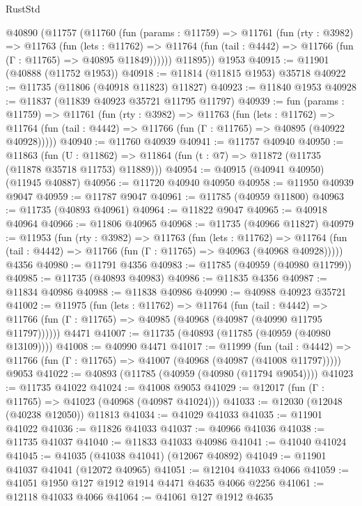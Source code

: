 \begin{lexlean}{RustStd}
\begin{coremodule}
    @40890
      (@11757
        (@11760
          (fun (params : @11759) =>
          @11761
            (fun (rty : @3982) =>
            @11763
              (fun (lets : @11762) =>
              @11764 (fun (tail : @4442) => @11766 (fun (Γ : @11765) => @40895 @11849))))))
        @11895))
    @1953
@40915 := @11901 (@40888 (@11752 @1953))
@40918 := @11814 (@11815 @1953) @35718
@40922 := @11735 (@11806 (@40918 @11823) @11827)
@40923 := @11840 @1953
@40928 := @11837 (@11839 @40923 @35721 @11795 @11797)
@40939 := fun (params : @11759) =>
  @11761
    (fun (rty : @3982) =>
    @11763
      (fun (lets : @11762) =>
      @11764 (fun (tail : @4442) => @11766 (fun (Γ : @11765) => @40895 (@40922 @40928)))))
@40940 := @11760 @40939
@40941 := @11757 @40940
@40950 := @11863
    (fun (U : @11862) => @11864 (fun (t : @7) => @11872 (@11735 (@11878 @35718 @11753) @11889)))
@40954 := @40915 (@40941 @40950) (@11945 @40887)
@40956 := @11720 @40940 @40950
@40958 := @11950 @40939 @9047
@40959 := @11787 @9047
@40961 := @11785 (@40959 @11800)
@40963 := @11735 (@40893 @40961)
@40964 := @11822 @9047
@40965 := @40918 @40964
@40966 := @11806 @40965
@40968 := @11735 (@40966 @11827)
@40979 := @11953
    (fun (rty : @3982) =>
    @11763
      (fun (lets : @11762) =>
      @11764 (fun (tail : @4442) => @11766 (fun (Γ : @11765) => @40963 (@40968 @40928)))))
    @4356
@40980 := @11791 @4356
@40983 := @11785 (@40959 (@40980 @11799))
@40985 := @11735 (@40893 @40983)
@40986 := @11835 @4356
@40987 := @11834 @40986
@40988 := @11838 @40986
@40990 := @40988 @40923 @35721
@41002 := @11975
    (fun (lets : @11762) =>
    @11764
      (fun (tail : @4442) =>
      @11766 (fun (Γ : @11765) => @40985 (@40968 (@40987 (@40990 @11795 @11797))))))
    @4471
@41007 := @11735 (@40893 (@11785 (@40959 (@40980 @13109))))
@41008 := @40990 @4471
@41017 := @11999
    (fun (tail : @4442) => @11766 (fun (Γ : @11765) => @41007 (@40968 (@40987 (@41008 @11797)))))
    @9053
@41022 := @40893 (@11785 (@40959 (@40980 (@11794 @9054))))
@41023 := @11735 @41022
@41024 := @41008 @9053
@41029 := @12017 (fun (Γ : @11765) => @41023 (@40968 (@40987 @41024)))
@41033 := @12030 (@12048 (@40238 @12050)) @11813
@41034 := @41029 @41033
@41035 := @11901 @41022
@41036 := @11826 @41033
@41037 := @40966 @41036
@41038 := @11735 @41037
@41040 := @11833 @41033 @40986
@41041 := @41040 @41024
@41045 := @41035 (@41038 @41041) (@12067 @40892)
@41049 := @11901 @41037 @41041 (@12072 @40965)
@41051 := @12104 @41033 @4066
@41059 := @41051 @1950 @127 @1912 @1914 @4471 @4635 @4066 @2256
@41061 := @12118 @41033 @4066
@41064 := @41061 @127 @1912 @4635

\end{coremodule}
\end{lexlean}
